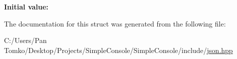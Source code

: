 {\bfseries Initial value\+:}
\begin{DoxyCode}{0}
\DoxyCodeLine{=}

\end{DoxyCode}


The documentation for this struct was generated from the following file\+:\begin{DoxyCompactItemize}
\item 
C\+:/\+Users/\+Pan Tomko/\+Desktop/\+Projects/\+Simple\+Console/\+Simple\+Console/include/\mbox{\hyperlink{json_8hpp}{json.\+hpp}}\end{DoxyCompactItemize}
